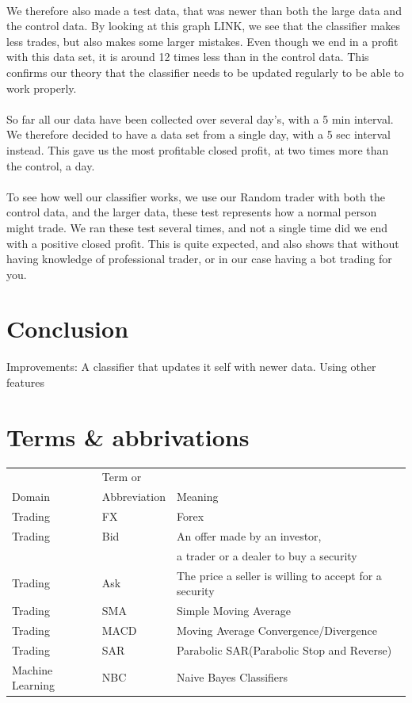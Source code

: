 \documentclass[10pt]{IEEEtran}
\begin{document}
\\
We therefore also made a test data, that was newer than both the large data and the control data. By looking at this graph LINK, we see that the classifier makes less trades, but also makes some larger mistakes. Even though we end in a profit with this data set, it is around 12 times less than in the control data. This confirms our theory that the classifier needs to be updated regularly to be able to work properly.
\\
\\
So far all our data have been collected over several day's, with a 5 min interval. We therefore decided to have a data set from a single day, with a 5 sec interval instead. This gave us the most profitable closed profit, at two times more than the control, a day.\\
\\
To see how well our classifier works, we use our Random trader with both the control data, and the larger data, these test represents how a normal person might trade. We ran these test several times, and not a single time did we end with a positive closed profit. This is quite expected, and also shows that without having knowledge of professional trader, or in our case having a bot trading for you.

\section{Conclusion}


Improvements:
A classifier that updates it self with newer data.
Using other features

\section{Terms \& abbrivations}
\begin{tabular}{l | l | l}
& Term or &\\
Domain & Abbreviation & Meaning\\
\hline
Trading & FX & Forex \\ 
Trading & Bid & An offer made by an investor,\\
& & a trader or a dealer to buy a security\\
Trading & Ask & The price a seller is willing to accept for a security\\
Trading & SMA & Simple Moving Average\\
Trading & MACD & Moving Average Convergence/Divergence\\
Trading & SAR & Parabolic SAR(Parabolic Stop and Reverse)\\
Machine Learning & NBC & Naive Bayes Classifiers\\
\end{tabular}




\end{document}
